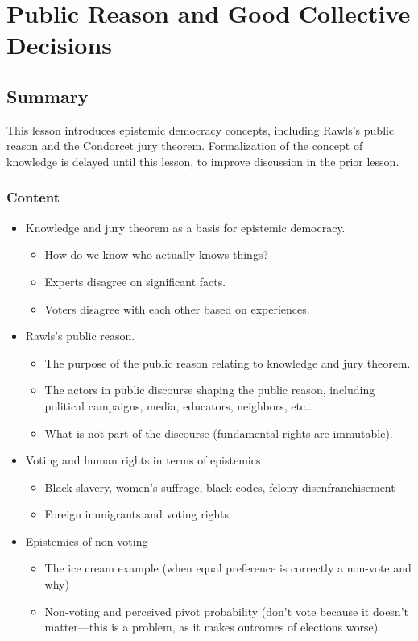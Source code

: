 \chapter{Public Reason and Good Collective Decisions}

\section{Summary}

This lesson introduces epistemic democracy concepts, including Rawls's public reason and the Condorcet jury theorem.  Formalization of the concept of knowledge is delayed until this lesson, to improve discussion in the prior lesson.

\subsection{Content}

\begin{itemize}
    \item Knowledge and jury theorem as a basis for epistemic democracy.
    \begin{itemize}
        \item How do we know who actually knows things?
        \item Experts disagree on significant facts.
        \item Voters disagree with each other based on experiences.
    \end{itemize}

    \item Rawls's public reason.
    \begin{itemize}
        \item The purpose of the public reason relating to knowledge and jury theorem.
        \item The actors in public discourse shaping the public reason, including political campaigns, media, educators, neighbors, etc..
        \item What is not part of the discourse (fundamental rights are immutable).
    \end{itemize}

    \item Voting and human rights in terms of epistemics
    \begin{itemize}
        \item Black slavery, women's suffrage, black codes, felony disenfranchisement
        \item Foreign immigrants and voting rights
    \end{itemize}

    \item Epistemics of non-voting
    \begin{itemize}
        \item The ice cream example (when equal preference is correctly a non-vote and why)
        \item Non-voting and perceived pivot probability (don't vote because it doesn't matter—this is a problem, as it makes outcomes of elections worse)
    \end{itemize}
\end{itemize}

